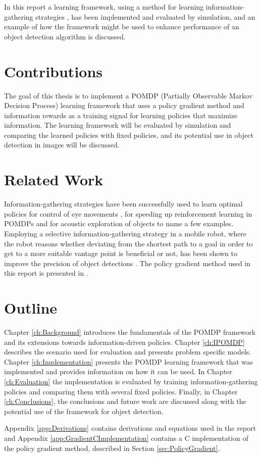 In this report a learning framework, using a method for learning information\hyp{}gathering strategies \cite{Butko2010b}, has been implemented and evaluated by simulation, and an example of how the framework might be used to enhance performance of an object detection algorithm is discussed.

\section{Contributions}

The goal of this thesis is to implement a POMDP (Partially Observable Markov Decision Process) learning framework that uses a policy gradient method and information rewards as a training signal for learning policies that maximize information. The learning framework will be evaluated by simulation and comparing the learned policies with fixed policies, and its potential use in object detection in images will be discussed.

\section{Related Work}
Information\hyp{}gathering strategies have been successfully used to learn optimal policies for control of eye movements \cite{Butko2010b}, for speeding up reinforcement learning in POMDPs \cite{Fasel2011a} and for acoustic exploration of objects \cite{Fasel2011b} to name a few examples.
Employing a selective information\hyp{}gathering strategy in a mobile robot, where the robot reasons whether deviating from the shortest path to a goal in order to get to a more suitable vantage point is beneficial or not, has been shown to improve the precision of object detections \cite{Velez2011}.
The policy gradient method used in this report is presented in \cite{BaxterB2001}.

\section{Outline}
Chapter \ref{ch:Background} introduces the fundamentals of the POMDP framework and its extensions towards information-driven policies. Chapter \ref{ch:IPOMDP} describes the scenario used for evaluation and presents problem specific models. Chapter \ref{ch:Implementation} presents the POMDP learning framework that was implemented and provides information on how it can be used. In Chapter \ref{ch:Evaluation} the implementation is evaluated by training information\hyp{}gathering policies and comparing them with several fixed policies. Finally, in Chapter \ref{ch:Conclusions}, the conclusions and future work are discussed along with the potential use of the framework for object detection.

Appendix \ref{app:Derivations} contains derivations and equations used in the report and Appendix \ref{app:GradientCImplementation} contains a C implementation of the policy gradient method, described in Section \ref{sec:PolicyGradient}.
